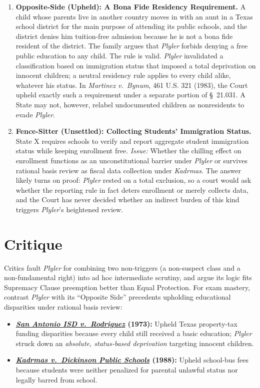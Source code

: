 \documentclass[12pt]{article}
\begin{document}
\begin{enumerate}
\item \textbf{Opposite-Side (Upheld): A Bona Fide Residency Requirement.} A child whose parents live in another country moves in with an aunt in a Texas school district for the main purpose of attending its public schools, and the district denies him tuition-free admission because he is not a bona fide resident of the district. The family argues that \textit{Plyler} forbids denying a free public education to any child. The rule is valid. \textit{Plyler} invalidated a classification based on immigration status that imposed a total deprivation on innocent children; a neutral residency rule applies to every child alike, whatever his status. In \textit{Martinez v.\ Bynum}, 461 U.S. 321 (1983), the Court upheld exactly such a requirement under a separate portion of \S~21.031. A State may not, however, relabel undocumented children as nonresidents to evade \textit{Plyler}.

\item \textbf{Fence-Sitter (Unsettled): Collecting Students' Immigration Status.} State X requires schools to verify and report aggregate student immigration status while keeping enrollment free. \textit{Issue:} Whether the chilling effect on enrollment functions as an unconstitutional barrier under \textit{Plyler} or survives rational basis review as fiscal data collection under \textit{Kadrmas}. The answer likely turns on proof: \textit{Plyler} rested on a total exclusion, so a court would ask whether the reporting rule in fact deters enrollment or merely collects data, and the Court has never decided whether an indirect burden of this kind triggers \textit{Plyler}'s heightened review.

\end{enumerate}

\section{Critique}
Critics fault \textit{Plyler} for combining two non-triggers (a non-suspect class and a non-fundamental right) into ad hoc intermediate scrutiny, and argue its logic fits Supremacy Clause preemption better than Equal Protection. For exam mastery, contrast \textit{Plyler} with its ``Opposite Side'' precedents upholding educational disparities under rational basis review:
\begin{itemize}
    \item \textbf{\href{https://supreme.justia.com/cases/federal/us/411/1/}{\textit{San Antonio ISD v.\ Rodriguez}} (1973):} Upheld Texas property-tax funding disparities because every child still received a basic education; \textit{Plyler} struck down an \textit{absolute, status-based deprivation} targeting innocent children.
    \item \textbf{\href{https://supreme.justia.com/cases/federal/us/487/450/}{\textit{Kadrmas v.\ Dickinson Public Schools}} (1988):} Upheld school-bus fees because students were neither penalized for parental unlawful status nor legally barred from school.
\end{itemize}
\end{document}
